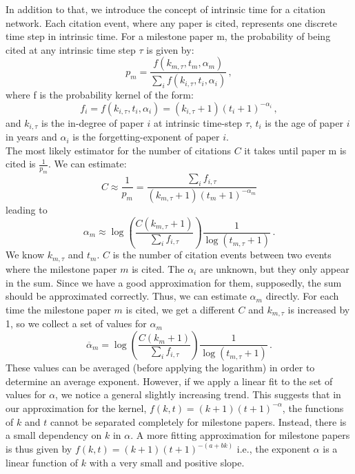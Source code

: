 \documentclass[draft,final]{vutinfth} %
\begin{document}
In addition to that, we introduce the concept of intrinsic time for a citation network. Each citation event, where any paper is cited, represents one discrete time step in intrinsic time. For a milestone paper m, the probability of being cited at any intrinsic time step $\tau$ is given by:
%
\begin{equation}
    p_m = \frac{f(k_{m, \tau}, t_m, \alpha_m)}{\sum_i f(k_{i, \tau}, t_i, \alpha_i)} \, ,
\end{equation}
%
where f is the probability kernel of the form:
%
\begin{equation}
    f_i = f(k_{i, \tau}, t_i, \alpha_i) = (k_{i, \tau}+1)(t_i + 1)^{-\alpha_i} \, , 
\end{equation}
%
and $k_{i, \tau}$ is the in-degree of paper $i$ at intrinsic time-step $\tau$, $t_i$ is the age of paper $i$ in years and $\alpha_i$ is the forgetting-exponent of paper $i$.\\
The most likely estimator for the number of citations $C$ it takes until paper m is cited is $\frac{1}{p_m}$. We can estimate:
%
\begin{equation}
    C \approx \frac{1}{p_m} = \frac{\sum_i f_{i, \tau}}{(k_{m, \tau}+1)(t_m + 1)^{-\alpha_m}}
\end{equation}
%
leading to 
%
\begin{equation}
\label{eq_alpha}
    \alpha_m \approx \log(\frac{C (k_{m, \tau}+1)}{\sum_i f_{i, \tau}}) \frac{1}{\log(t_{m, \tau}+1)} \, .
\end{equation}
%
We know $k_{m, \tau}$ and  $t_{m}$. $C$ is the number of citation events between two events where the milestone paper $m$ is cited. 
The $\alpha_i$ are unknown, but they only appear in the sum. Since we have a good approximation for them, supposedly, the sum should be approximated correctly. Thus, we can estimate $\alpha_m$ directly. For each time the milestone paper $m$ is cited, we get a different $C$ and $k_{m, \tau}$ is increased by 1, so we collect a set of values for $\alpha_m$
%
\begin{equation}
\label{eq:msalpha}
    \overline{\alpha}_m = \log(\frac{C(k_m+1)}{\sum_i f_{i, \tau}})\frac{1}{\log(t_{m, \tau}+1)} \, . 
\end{equation}
%
These values can be averaged (before applying the logarithm) in order to determine an average exponent. However, if we apply a linear fit to the set of values for $\alpha$, we notice a general slightly increasing trend. This suggests that in our approximation for the kernel, $f(k,t) = (k+1)(t + 1)^{-\alpha}$, the functions of $k$ and $t$ cannot be separated completely for milestone papers. Instead, there is a small dependency on $k$ in $\alpha$. A more fitting approximation for milestone papers is thus given by $f(k,t) = (k+1)(t + 1)^{-(a+bk)}$ i.e., the exponent $\alpha$ is a linear function of $k$ with a very small and positive slope.
\end{document}
